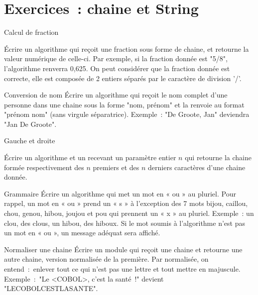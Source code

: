 \clearpage
\section{Exercices~: chaine et String}
\bigskip

	\begin{Exercice}{Calcul de fraction}
		
		Écrire un algorithme qui reçoit une fraction sous forme de chaine, et
		retourne la valeur numérique de celle-ci.  Par exemple, si la fraction
		donnée est "5/8", l’algorithme renverra 0,625.  On peut considérer que
		la fraction donnée est correcte, elle est composée de 2 entiers séparés
		par le caractère de division '/'.

\end{Exercice}

\begin{Exercice}{Conversion de nom}
	Écrire un algorithme 
	qui reçoit le nom complet d’une personne 
	dans une chaine sous la forme "nom, prénom" 
	et la renvoie au format "prénom nom" 
	(sans virgule séparatrice). 
	Exemple~: "De Groote, Jan" deviendra "Jan De Groote".	
\end{Exercice}

\begin{Exercice}{Gauche et droite}

	Écrire un algorithme  et un  recevant un paramètre
	entier $n$ qui retourne la chaine formée respectivement des $n$ premiers et
	des $n$ derniers caractères d’une chaine donnée.	

\end{Exercice}

\begin{Exercice}{Grammaire}
	Écrire un algorithme 
	qui met un mot en « ou » au pluriel. 
	Pour rappel, 
	un mot en « ou » prend un « s » à l’exception des 7 mots 
	bijou, caillou, chou, genou, hibou, joujou et pou qui prennent 
	un « x » au pluriel. 
	Exemple~: un clou, des clous, un hibou, des hiboux. 
	Si le mot soumis à l’algorithme n’est pas un mot en « ou », 
	un message adéquat sera affiché.
\end{Exercice}

\begin{Exercice}{Normaliser une chaine}
	Écrire un module qui reçoit une chaine et retourne une autre chaine,
	version normalisée de la première.
	Par normalisée, on entend~:~enlever tout ce qui n’est pas une lettre 
	et tout mettre en majuscule.
	\\Exemple~:~"Le <COBOL>, c’est la santé~!" devient "LECOBOLCESTLASANTE".
\end{Exercice}


